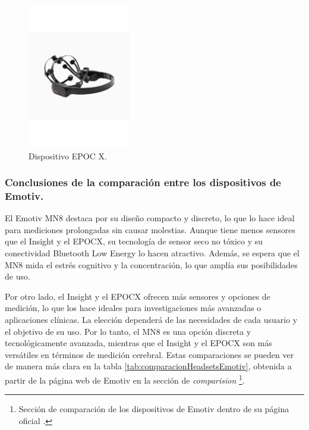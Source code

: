 \begin{figure}[H]
    \centering
    \includegraphics[width=0.4\textwidth]{img/EPOCX.pdf}
    \caption{Dispositivo EPOC X.}
    \label{fig: EPOC X}
\end{figure}

\subsubsection{Conclusiones de la comparación entre los dispositivos de Emotiv.}
El Emotiv MN8 destaca por su diseño compacto y discreto, lo que lo hace ideal para mediciones prolongadas sin causar molestias. Aunque tiene menos sensores que el Insight y el EPOCX, su tecnología de sensor seco no tóxico y su conectividad Bluetooth Low Energy lo hacen atractivo. Además, se espera que el MN8 mida el estrés cognitivo y la concentración, lo que amplía sus posibilidades de uso.

Por otro lado, el Insight y el EPOCX ofrecen más sensores y opciones de medición, lo que los hace ideales para investigaciones más avanzadas o aplicaciones clínicas. La elección dependerá de las necesidades de cada usuario y el objetivo de su uso. Por lo tanto, el MN8 es una opción discreta y tecnológicamente avanzada, mientras que el Insight y el EPOCX son más versátiles en términos de medición cerebral. Estas comparaciones se pueden ver de manera más clara en la tabla \ref{tab:comparacionHeadsetsEmotiv}, obtenida a partir de la página web de Emotiv en la sección de \textit{comparision} \cite{comparacionHeadsets}\footnote{Sección de comparación de los dispositivos de Emotiv dentro de su página oficial \cite{comparacionHeadsets}.}.

